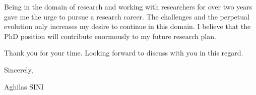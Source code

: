 \documentclass[10pt,a4paper]{letter}
\begin{document}
	Being in the domain of research and working  with researchers for over two years gave me the urge to pursue a research career. The challenges and the perpetual evolution only increases my desire to continue in this domain. I believe that the PhD position will contribute enormously to my future research plan.
 
	Thank you for your time. Looking forward to discuss with you in this regard.
	
Sincerely,

Aghilas SINI
	
		
\end{document}
